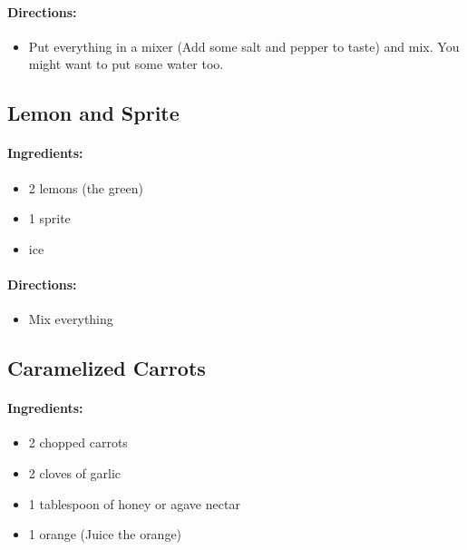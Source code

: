 \documentclass{article}
\begin{document}
\paragraph{Directions:}

\begin{itemize}
	\item Put everything in a mixer (Add some salt and pepper to taste) and mix. You might want to put some water too.
\end{itemize}

\subsection{Lemon and Sprite}

\paragraph{Ingredients:}

\begin{itemize}
	\item 2 lemons (the green)
	\item 1 sprite
	\item ice
\end{itemize}

\paragraph{Directions:}
\begin{itemize}
	\item Mix everything
\end{itemize}

\subsection{Caramelized Carrots}

\paragraph{Ingredients:}

\begin{itemize}
	\item 2 chopped carrots
	\item 2 cloves of garlic
	\item 1 tablespoon of honey or agave nectar
	\item 1 orange (Juice the orange)
\end{itemize}
\end{document}
